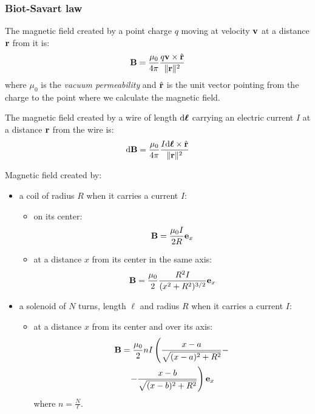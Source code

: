 \documentclass[../../../main.tex]{subfiles}
\begin{document}
\begin{multicols}{2}
    \subsubsection*{Biot-Savart law}
    \begin{prop}
        The magnetic field created by a point charge $q$ moving at velocity $\boldsymbol{\mathrm{v}}$ at a distance $\boldsymbol{\mathrm{r}}$ from it is:
        $$\boldsymbol{\mathrm{B}}=\frac{\mu_0}{4\pi}\frac{q\boldsymbol{\mathrm{v}}\times\Hat{\boldsymbol{\mathrm{r}}}}{\|\boldsymbol{\mathrm{r}}\|^2}$$ where $\mu_0$ is the \textit{vacuum permeability} and $\Hat{\boldsymbol{\mathrm{r}}}$ is the unit vector pointing from the charge to the point where we calculate the magnetic field.
    \end{prop}
    \begin{law}
        The magnetic field created by a wire of length $\dd\vb*{\ell}$ carrying an electric current $I$ at a distance $\boldsymbol{\mathrm{r}}$ from the wire is: $$\dd\boldsymbol{\mathrm{B}}=\frac{\mu_0}{4\pi}\frac{I\dd\vb*{\ell}\times\hat{\boldsymbol{\mathrm{r}}}}{\|\boldsymbol{\mathrm{r}}\|^2}$$
    \end{law}
    \begin{prop}
        Magnetic field created by:
        \begin{itemize}
            \item a coil of radius $R$ when it carries a current $I$:
                  \begin{itemize}
                      \item on its center: $$\boldsymbol{\mathrm{B}}=\frac{\mu_0I}{2R}\boldsymbol{\mathrm{e}}_x$$
                      \item at a distance $x$ from its center in the same axis: $$\boldsymbol{\mathrm{B}}=\frac{\mu_0}{2}\frac{R^2I}{(x^2+R^2)^{3/2}}\boldsymbol{\mathrm{e}}_x$$
                  \end{itemize}
            \item a solenoid of $N$ turns, length $\ell$ and radius $R$ when it carries a current $I$:
                  \begin{itemize}
                      \item at a distance $x$ from its center and over its axis:
                            \begin{multline*} \boldsymbol{\mathrm{B}}=\frac{\mu_0}{2}nI\left(\frac{x-a}{\sqrt{(x-a)^2+R^2}}-\right.\\\left.-\frac{x-b}{\sqrt{(x-b)^2+R^2}}\right)\boldsymbol{\mathrm{e}}_x
                            \end{multline*} where $n=\frac{N}{\ell}$.

\end{itemize}
\end{itemize}
\end{prop}
\end{multicols}
\end{document}
